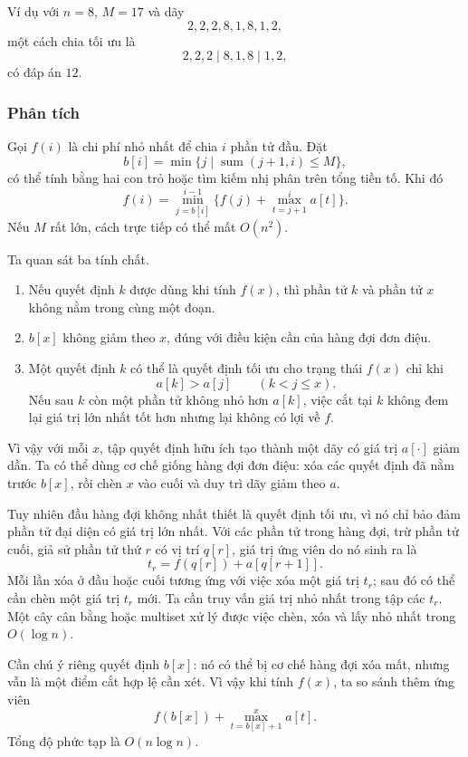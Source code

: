 \documentclass[11pt]{article}
\begin{document}
Ví dụ với $n=8$, $M=17$ và dãy
\[
  2,2,2,8,1,8,1,2,
\]
một cách chia tối ưu là
\[
  2,2,2 \mid 8,1,8 \mid 1,2,
\]
có đáp án $12$.

\subsubsection*{Phân tích}

Gọi $f(i)$ là chi phí nhỏ nhất để chia $i$ phần tử đầu. Đặt
\[
  b[i]=\min\{j\mid \operatorname{sum}(j+1,i)\le M\},
\]
có thể tính bằng hai con trỏ hoặc tìm kiếm nhị phân trên tổng tiền tố. Khi đó
\[
  f(i)=\min_{j=b[i]}^{i-1}
  \{f(j)+\max_{t=j+1}^{i} a[t]\}.
\]
Nếu $M$ rất lớn, cách trực tiếp có thể mất $O(n^2)$.

Ta quan sát ba tính chất.

\begin{enumerate}
  \item Nếu quyết định $k$ được dùng khi tính $f(x)$, thì phần tử $k$ và phần
  tử $x$ không nằm trong cùng một đoạn.

  \item $b[x]$ không giảm theo $x$, đúng với điều kiện cần của hàng đợi đơn
  điệu.

  \item Một quyết định $k$ có thể là quyết định tối ưu cho trạng thái $f(x)$
  chỉ khi
  \[
    a[k] > a[j]\qquad (k<j\le x).
  \]
  Nếu sau $k$ còn một phần tử không nhỏ hơn $a[k]$, việc cắt tại $k$ không
  đem lại giá trị lớn nhất tốt hơn nhưng lại không có lợi về $f$.
\end{enumerate}

Vì vậy với mỗi $x$, tập quyết định hữu ích tạo thành một dãy có giá trị
$a[\cdot]$ giảm dần. Ta có thể dùng cơ chế giống hàng đợi đơn điệu: xóa các
quyết định đã nằm trước $b[x]$, rồi chèn $x$ vào cuối và duy trì dãy giảm
theo $a$.

Tuy nhiên đầu hàng đợi không nhất thiết là quyết định tối ưu, vì nó chỉ bảo
đảm phần tử đại diện có giá trị lớn nhất. Với các phần tử trong hàng đợi,
trừ phần tử cuối, giả sử phần tử thứ $r$ có vị trí $q[r]$, giá trị ứng viên
do nó sinh ra là
\[
  t_r=f(q[r])+a[q[r+1]].
\]
Mỗi lần xóa ở đầu hoặc cuối tương ứng với việc xóa một giá trị $t_r$; sau đó
có thể cần chèn một giá trị $t_r$ mới. Ta cần truy vấn giá trị nhỏ nhất trong
tập các $t_r$. Một cây cân bằng hoặc multiset xử lý được việc chèn, xóa và
lấy nhỏ nhất trong $O(\log n)$.

Cần chú ý riêng quyết định $b[x]$: nó có thể bị cơ chế hàng đợi xóa mất,
nhưng vẫn là một điểm cắt hợp lệ cần xét. Vì vậy khi tính $f(x)$, ta so sánh
thêm ứng viên
\[
  f(b[x])+\max_{t=b[x]+1}^{x}a[t].
\]
Tổng độ phức tạp là $O(n\log n)$.
\end{document}
